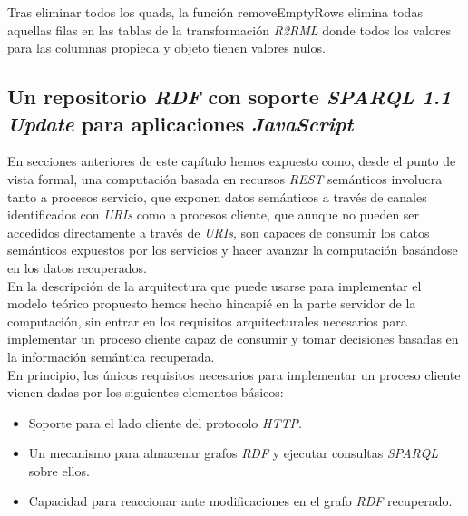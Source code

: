 Tras eliminar todos los quads, la funci\'on removeEmptyRows elimina todas aquellas filas en las tablas de la transformaci\'on \textit{R2RML} donde todos los valores para las columnas propieda y objeto tienen valores nulos.

\subsection{Un repositorio \textit{RDF} con soporte \textit{SPARQL 1.1 Update} para aplicaciones \textit{JavaScript}}

En secciones anteriores de este cap\'itulo hemos expuesto como, desde el punto de vista formal, una computaci\'on basada en recursos \textit{REST} sem\'anticos involucra tanto a procesos servicio, que exponen datos sem\'anticos a trav\'es de canales identificados con \textit{URIs} como a procesos cliente, que aunque no pueden ser accedidos directamente a trav\'es de \textit{URIs}, son capaces de consumir los datos sem\'anticos expuestos por los servicios y hacer avanzar la computaci\'on bas\'andose en los datos recuperados.\\
En la descripci\'on de la arquitectura que puede usarse para implementar el modelo te\'orico propuesto hemos hecho hincapi\'e en la parte servidor de la computaci\'on, sin entrar en los requisitos arquitecturales necesarios para implementar un proceso cliente capaz de consumir y tomar decisiones basadas en la informaci\'on sem\'antica recuperada.\\
En principio, los \'unicos requisitos necesarios para implementar un proceso cliente vienen dadas por los siguientes elementos b\'asicos:

\begin{itemize}
\item Soporte para el lado cliente del protocolo \textit{HTTP}.
\item Un mecanismo para almacenar grafos \textit{RDF} y ejecutar consultas \textit{SPARQL} sobre ellos.
\item Capacidad para reaccionar ante modificaciones en el grafo \textit{RDF} recuperado.
\end{itemize}

